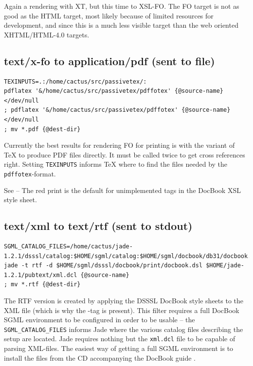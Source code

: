 Again a rendering with XT, but this time to XSL-FO.  The FO target is
not as good as the HTML target, most likely because of limited
resources for development, and since this is a much less visible
target than the web oriented XHTML/HTML-4.0 targets.

\subsection*{text/x-fo to application/pdf (sent to file)}
  {\footnotesize
\begin{verbatim}
TEXINPUTS=.:/home/cactus/src/passivetex/:
pdflatex '&/home/cactus/src/passivetex/pdffotex' {@source-name}</dev/null
; pdflatex '&/home/cactus/src/passivetex/pdffotex' {@source-name}</dev/null
; mv *.pdf {@dest-dir}
\end{verbatim}
}

Currently the best results for rendering FO for printing is
 with the
variant of {\TeX} to produce PDF files directly.  It must be called
twice to get cross references right.  Setting \texttt{TEXINPUTS}
informs {\TeX} where to find the files needed by the
\texttt{pdffotex}-format.


See  -- The red print is
  the default for unimplemented tags in the DocBook XSL style sheet.

\subsection*{text/xml to text/rtf (sent to stdout)}
  {\footnotesize
\begin{verbatim}
SGML_CATALOG_FILES=/home/cactus/jade-1.2.1/dsssl/catalog:$HOME/sgml/catalog:$HOME/sgml/docbook/db31/docbook.cat
jade -t rtf -d $HOME/sgml/dsssl/docbook/print/docbook.dsl $HOME/jade-1.2.1/pubtext/xml.dcl {@source-name}
; mv *.rtf {@dest-dir}
\end{verbatim}
}

The RTF version is created by applying the DSSSL DocBook style sheets
to the XML file (which is why the -tag is present).
This filter requires a full DocBook SGML environment to be configured
in order to be usable -- the \texttt{SGML_CATALOG_FILES} informs Jade
where the various catalog files describing the setup are located.
Jade requires nothing but the \texttt{xml.dcl} file to be capable of
parsing XML-files.  The easiest way of getting a full SGML environment
is to install the files from the CD accompanying the DocBook guide
\cite{walsh-muellner:docbook-the-definitive-guide}.

